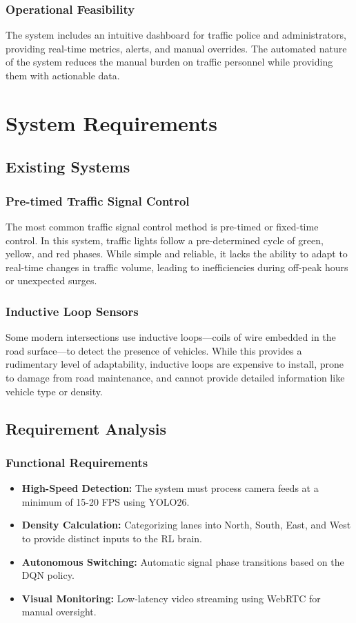 \documentclass[12pt,a4paper]{report}
\begin{document}
\subsection{Operational Feasibility}
The system includes an intuitive dashboard for traffic police and administrators, providing real-time metrics, alerts, and manual overrides. The automated nature of the system reduces the manual burden on traffic personnel while providing them with actionable data.

\chapter{System Requirements}
\section{Existing Systems}
\subsection{Pre-timed Traffic Signal Control}
The most common traffic signal control method is pre-timed or fixed-time control. In this system, traffic lights follow a pre-determined cycle of green, yellow, and red phases. While simple and reliable, it lacks the ability to adapt to real-time changes in traffic volume, leading to inefficiencies during off-peak hours or unexpected surges.

\subsection{Inductive Loop Sensors}
Some modern intersections use inductive loops—coils of wire embedded in the road surface—to detect the presence of vehicles. While this provides a rudimentary level of adaptability, inductive loops are expensive to install, prone to damage from road maintenance, and cannot provide detailed information like vehicle type or density.

\section{Requirement Analysis}
\subsection{Functional Requirements}
\begin{itemize}
    \item \textbf{High-Speed Detection:} The system must process camera feeds at a minimum of 15-20 FPS using YOLO26.
    \item \textbf{Density Calculation:} Categorizing lanes into North, South, East, and West to provide distinct inputs to the RL brain.
    \item \textbf{Autonomous Switching:} Automatic signal phase transitions based on the DQN policy.
    \item \textbf{Visual Monitoring:} Low-latency video streaming using WebRTC for manual oversight.
\end{itemize}
\end{document}
